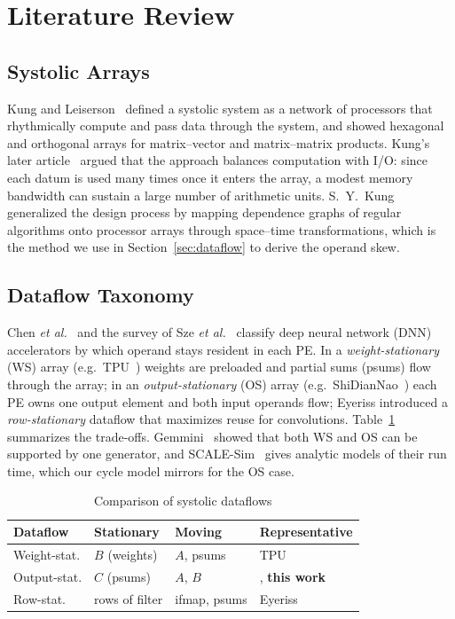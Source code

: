 \documentclass[conference]{IEEEtran}
\begin{document}
\section{Literature Review}

\subsection{Systolic Arrays}
Kung and Leiserson~\cite{kung1979systolic} defined a systolic system as a
network of processors that rhythmically compute and pass data through the
system, and showed hexagonal and orthogonal arrays for matrix--vector and
matrix--matrix products. Kung's later article~\cite{kung1982why} argued that
the approach balances computation with I/O: since each datum is used many times
once it enters the array, a modest memory bandwidth can sustain a large number
of arithmetic units. S.~Y.~Kung~\cite{kung1988vlsi} generalized the design
process by mapping dependence graphs of regular algorithms onto processor
arrays through space--time transformations, which is the method we use in
Section~\ref{sec:dataflow} to derive the operand skew.

\subsection{Dataflow Taxonomy}
Chen \emph{et al.}~\cite{chen2017eyeriss} and the survey of Sze
\emph{et al.}~\cite{sze2017efficient} classify deep neural network (DNN) accelerators by which
operand stays resident in each PE. In a \emph{weight-stationary} (WS) array
(e.g.\ TPU~\cite{jouppi2017tpu}) weights are preloaded and partial sums (psums) flow
through the array; in an \emph{output-stationary} (OS) array
(e.g.\ ShiDianNao~\cite{du2015shidiannao}) each PE owns one output element and
both input operands flow; Eyeriss introduced a \emph{row-stationary} dataflow
that maximizes reuse for convolutions. Table~\ref{tab:dataflow} summarizes the
trade-offs. Gemmini~\cite{genc2021gemmini} showed that both WS and OS can be
supported by one generator, and SCALE-Sim~\cite{samajdar2018scalesim} gives
analytic models of their run time, which our cycle model mirrors for the OS
case.

\begin{table}[t]
\centering
\caption{Comparison of systolic dataflows}
\label{tab:dataflow}
\setlength{\tabcolsep}{3pt}
\begin{tabular}{@{}llll@{}}
\toprule
Dataflow & Stationary & Moving & Representative \\
\midrule
Weight-stat.  & $B$ (weights)  & $A$, psums & TPU~\cite{jouppi2017tpu} \\
Output-stat.  & $C$ (psums)    & $A$, $B$         & \cite{du2015shidiannao}, \textbf{this work} \\
Row-stat.     & rows of filter & ifmap, psums     & Eyeriss~\cite{chen2017eyeriss} \\
\bottomrule
\end{tabular}
\end{table}
\end{document}
